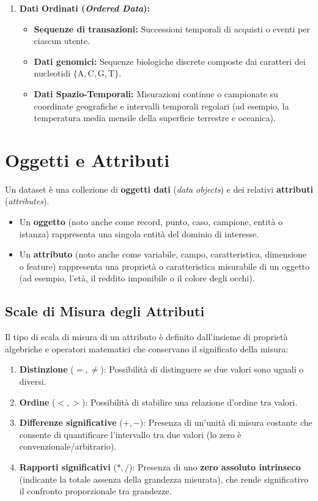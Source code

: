 \begin{enumerate}
    \item \textbf{Dati Ordinati (\textit{Ordered Data}):}
    \begin{itemize}
        \item \textbf{Sequenze di transazioni:} Successioni temporali di acquisti o eventi per ciascun utente.
        \item \textbf{Dati genomici:} Sequenze biologiche discrete composte dai caratteri dei nucleotidi $\{\text{A}, \text{C}, \text{G}, \text{T}\}$.
        \item \textbf{Dati Spazio-Temporali:} Misurazioni continue o campionate su coordinate geografiche e intervalli temporali regolari (ad esempio, la temperatura media mensile della superficie terrestre e oceanica).
    \end{itemize}
\end{enumerate}

\section{Oggetti e Attributi}

Un dataset è una collezione di \textbf{oggetti dati} (\textit{data objects}) e dei relativi \textbf{attributi} (\textit{attributes}).
\begin{itemize}
    \item Un \textbf{oggetto} (noto anche come record, punto, caso, campione, entità o istanza) rappresenta una singola entità del dominio di interesse.
    \item Un \textbf{attributo} (noto anche come variabile, campo, caratteristica, dimensione o feature) rappresenta una proprietà o caratteristica misurabile di un oggetto (ad esempio, l'età, il reddito imponibile o il colore degli occhi).
\end{itemize}

\subsection{Scale di Misura degli Attributi}
Il tipo di scala di misura di un attributo è definito dall'insieme di proprietà algebriche e operatori matematici che conservano il significato della misura:
\begin{enumerate}
    \item \textbf{Distinzione} ($=, \neq$): Possibilità di distinguere se due valori sono uguali o diversi.
    \item \textbf{Ordine} ($<, >$): Possibilità di stabilire una relazione d'ordine tra valori.
    \item \textbf{Differenze significative} ($+, -$): Presenza di un'unità di misura costante che consente di quantificare l'intervallo tra due valori (lo zero è convenzionale/arbitrario).
    \item \textbf{Rapporti significativi} ($*, /$): Presenza di uno \textbf{zero assoluto intrinseco} (indicante la totale assenza della grandezza misurata), che rende significativo il confronto proporzionale tra grandezze.
\end{enumerate}

